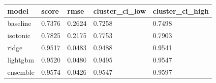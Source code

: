 \begin{tabular}{lllll}
\toprule
model & score & rmse & cluster\_ci\_low & cluster\_ci\_high \\
\midrule
baseline & 0.7376 & 0.2624 & 0.7258 & 0.7498 \\
isotonic & 0.7825 & 0.2175 & 0.7753 & 0.7903 \\
ridge & 0.9517 & 0.0483 & 0.9488 & 0.9541 \\
lightgbm & 0.9520 & 0.0480 & 0.9495 & 0.9547 \\
ensemble & 0.9574 & 0.0426 & 0.9547 & 0.9597 \\
\bottomrule
\end{tabular}
